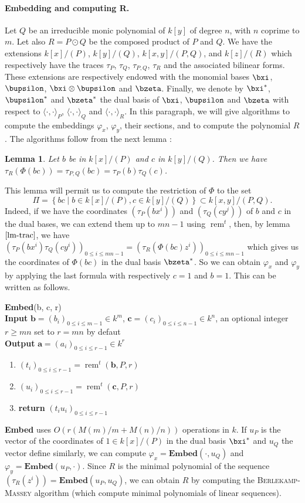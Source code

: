 \documentclass[a4paper,11pt]{article}
\theoremstyle{break}
\newtheorem{lm}[thm]{Lemma}
\theoremstyle{definition}
\theoremstyle{remark}
\DeclareMathOperator{\rem}{rem}
\newcommand{\ps}[2]{\langle#1,#2\rangle}
\newcommand{\psdot}{\ps{\cdot}{\cdot}}
\newcommand{\remt}{\rem^t}
\begin{document}
\paragraph{Embedding and computing R.} Let $Q$ be an irreducible monic
polynomial of $k[y]$ of degree $n$, with $n$ coprime to $m$. Let also $R=P\odot
Q$ be the composed product of $P$ and $Q$. We have the extensions $k[x]/(P)$,
$k[y]/(Q)$, $k[x,y]/(P,Q)$, and $k[z]/(R)$ which respectively have the traces
$\tau_P$, $\tau_Q$, $\tau_{P,Q}$, $\tau_R$ and the associated bilinear forms.
These extensions are respectively endowed with the monomial bases $\bxi$,
$\bupsilon$, $\bxi\otimes\bupsilon$ and $\bzeta$. Finally, we denote by
$\bxi^*$, $\bupsilon^*$ and $\bzeta^*$ the dual basis of $\bxi$, $\bupsilon$ and
$\bzeta$ with respect to $\psdot_P$, $\psdot_Q$ and $\psdot_R$. In this paragraph, we will
give algorithms to compute the embeddings $\varphi_x$, $\varphi_y$, their
sections, and to compute the polynomial $R$. The algorithms follow from the next
lemma :
\begin{lm}
  \label{lm-trac}
  Let $b$ be in $k[x]/(P)$ and $c$ in $k[y]/(Q)$. Then we have
  $\tau_R(\Phi(bc))=\tau_{P,Q}(bc)=\tau_P(b)\tau_Q(c)$.
\end{lm}
This lemma will permit us to compute the restriction of $\Phi$ to the set 
\[
  \Pi=\left\{ bc \;|\; b\in k[x]/(P), c\in k[y]/(Q) \right\}\subset
  k[x,y]/(P,Q).
\]
Indeed, if we have the coordinates $(\tau_P(bx^i))$ and $(\tau_Q(cy^j))$ of $b$ and
$c$ in the dual bases, we can extend them up to $mn-1$ using $\remt$, then, by lemma $\ref{lm-trac}$, we have
$(\tau_P(bx^i)\tau_Q(cy^i))_{0\leq i \leq mn-1}=(\tau_R(\Phi(bc)z^i))_{0\leq i
\leq mn-1}$ which gives us the coordinates of $\Phi(bc)$ in the dual basis
$\bzeta^*$. So we can obtain $\varphi_x$ and $\varphi_y$ by applying the last
formula with respectively $c=1$ and $b=1$. This can be written as follows.
\newline

\textbf{Embed}(b, c, r)\\
\textbf{Input} $\textbf{b}=(b_i)_{0\leq i\leq m-1}\in k^m$,
$\textbf{c}=(c_i)_{0\leq i\leq n-1}\in k^n$, an optional integer $r\geq mn$ set
to $r=mn$ by defaut\\
\textbf{Output} $\textbf{a}=(a_i)_{0\leq i\leq r-1}\in k^r$
\begin{enumerate}
  \item $(t_i)_{0\leq i \leq r-1}=\remt(\textbf{b},P,r)$
  \item $(u_i)_{0\leq i \leq r-1}=\remt(\textbf{c},P,r)$
  \item \textbf{return} $(t_iu_i)_{0\leq i \leq r-1}$
\end{enumerate}
\textbf{Embed} uses $O(r(M(m)/m + M(n)/n))$ operations in $k$.
If $u_P$ is the vector of the coordinates of $1\in k[x]/(P)$ in the dual basis
$\bxi^*$ and $u_Q$ the vector define similarly, we can compute
$\varphi_x=\textbf{Embed}(\cdot,u_Q)$ and $\varphi_y=\textbf{Embed}(u_P,\cdot)$.
Since $R$ is the minimal polynomial of the sequence
$(\tau_R(z^i))=\textbf{Embed}(u_P,u_Q)$, we can obtain $R$ by computing the
\textsc{Berlekamp-Massey} algorithm (which compute minimal polynomials of linear
sequences).
\end{document}
